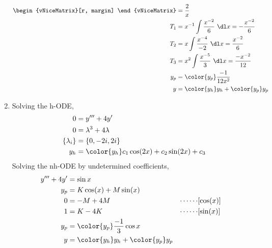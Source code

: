 \begin{enumerate}
\begin{align}
\begin{vNiceMatrix}[r, margin]
                           \end{vNiceMatrix} & = \frac{2}{x}                                            \\
              T_1                                         & = x^{-1} \int \frac{x^{-2}}{6}\ \dl x
              = -\frac{x^{-2}}{6}                                                                       \\
              T_2                                         & = x \int \frac{x^{-4}}{-2}\ \dl x
              = \frac{x^{-2}}{6}                                                                        \\
              T_3                                         & = x^{2} \int \frac{x^{-5}}{3}\ \dl x
              = \frac{-x^{-2}}{12}                                                                      \\
              y_{p}                                       & = \color{y_p} \frac{-1}{12x^{2}}            \\
              y                                           & = {\color{y_h} y_{h}} + {\color{y_p} y_{p}}
          \end{align}

    \item Solving the h-ODE,
          \begin{align}
              0               & = y''' + 4y'                                    \\
              0               & = \lambda^{3} + 4\lambda                        \\
              \{\lambda_{i}\} & = \{0, -2i, 2i\}                                \\
              y_{h}           & = \color{y_h} c_1 \cos(2x) + c_2 \sin(2x) + c_3
          \end{align}
          Solving the nh-ODE by undetermined coefficients,
          \begin{align}
              y''' + 4y' & = \sin x                                                               \\
              y_{p}      & = K\cos(x) + M\sin(x)                                                  \\
              0          & = -M + 4M                                   & \cdots\cdots & [\cos(x)] \\
              1          & = K - 4K                                    & \cdots\cdots & [\sin(x)] \\
              y_{p}      & = \color{y_p} \frac{-1}{3}\cos x                                       \\
              y          & = {\color{y_h} y_{h}} + {\color{y_p} y_{p}}
          \end{align}


\end{enumerate}
